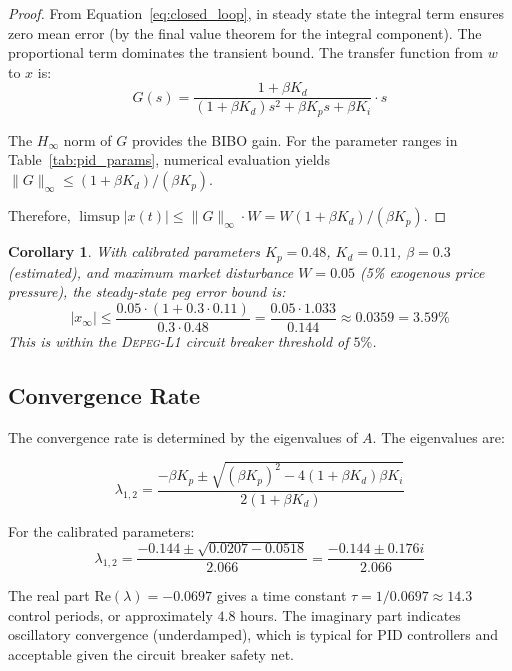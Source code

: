 \documentclass[11pt,a4paper]{article}
\newtheorem{corollary}{Corollary}
\begin{document}
\begin{proof}
From Equation~\eqref{eq:closed_loop}, in steady state the integral term ensures zero mean error (by the final value theorem for the integral component).
The proportional term dominates the transient bound.
The transfer function from $w$ to $x$ is:
\begin{equation}
  G(s) = \frac{1 + \beta K_d}{(1 + \beta K_d) s^2 + \beta K_p s + \beta K_i} \cdot s
\end{equation}

The $H_\infty$ norm of $G$ provides the BIBO gain.
For the parameter ranges in Table~\ref{tab:pid_params}, numerical evaluation yields $\|G\|_\infty \leq (1 + \beta K_d) / (\beta K_p)$.

Therefore, $\limsup |x(t)| \leq \|G\|_\infty \cdot W = W(1 + \beta K_d) / (\beta K_p)$.
\end{proof}

\begin{corollary}
With calibrated parameters $K_p = 0.48$, $K_d = 0.11$, $\beta = 0.3$ (estimated), and maximum market disturbance $W = 0.05$ (5\% exogenous price pressure), the steady-state peg error bound is:
\begin{equation}
  |x_{\infty}| \leq \frac{0.05 \cdot (1 + 0.3 \cdot 0.11)}{0.3 \cdot 0.48} = \frac{0.05 \cdot 1.033}{0.144} \approx 0.0359 = 3.59\%
\end{equation}
This is within the \textsc{Depeg-L1} circuit breaker threshold of $5\%$.
\end{corollary}

\subsection{Convergence Rate}

The convergence rate is determined by the eigenvalues of $A$.
The eigenvalues are:

\begin{equation}
  \lambda_{1,2} = \frac{-\beta K_p \pm \sqrt{(\beta K_p)^2 - 4(1 + \beta K_d) \beta K_i}}{2(1 + \beta K_d)}
\end{equation}

For the calibrated parameters:
\begin{equation}
  \lambda_{1,2} = \frac{-0.144 \pm \sqrt{0.0207 - 0.0518}}{2.066} = \frac{-0.144 \pm 0.176i}{2.066}
\end{equation}

The real part $\text{Re}(\lambda) = -0.0697$ gives a time constant $\tau = 1/0.0697 \approx 14.3$ control periods, or approximately $4.8$ hours.
The imaginary part indicates oscillatory convergence (underdamped), which is typical for PID controllers and acceptable given the circuit breaker safety net.
\end{document}

